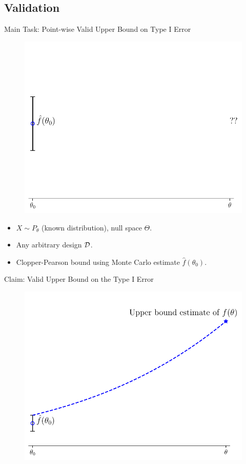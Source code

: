 \subsection{Validation}
\frame{\tableofcontents[currentsubsection]}

\begin{frame}{Main Task: Point-wise Valid Upper Bound on Type I Error}
\begin{figure}
    \centering
    \includegraphics[width=0.75\linewidth]{figs/validation_problem.pdf}
\end{figure}
\begin{itemize}
    \item $X \sim P_\theta$ (known distribution), null space $\Theta$.
    \item Any arbitrary design $\mathcal{D}$.
    \item Clopper-Pearson bound using Monte Carlo estimate $\hat{f}(\theta_0)$.
\end{itemize} 
\end{frame}

\begin{frame}{Claim: Valid Upper Bound on the Type I Error}
\begin{figure}
    \centering
    \includegraphics[width=0.95\linewidth]{figs/validation_solution.pdf}
\end{figure} 
\end{frame}

